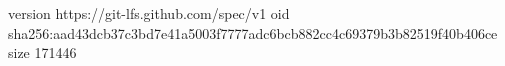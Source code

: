 version https://git-lfs.github.com/spec/v1
oid sha256:aad43dcb37c3bd7e41a5003f7777adc6bcb882cc4c69379b3b82519f40b406ce
size 171446
